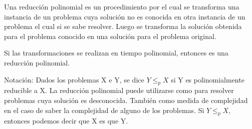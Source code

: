 \documentclass[../tp3_grupo404.tex]{subfiles}
\begin{document}
Una reducción polinomial es un procedimiento por el cual se transforma una instancia de un problema
cuya solución no es conocida en otra instancia de un problema el cual si se sabe resolver.
Luego se transforma la solución obtenida para el problema conocido en una solución para el problema
original.

Si las transformaciones se realizan en tiempo polinomial, entonces es una reducción polinomial.

Notación: Dados los problemas X e Y, se dice $Y \leq_p X$ si Y es polinomialmente reducible a X.
La reducción polinomial puede utilizarse como  para resolver problemas
cuya solución es desconocida. También como medida de complejidad en el caso de saber la
complejidad de alguno de los problemas.
Si $Y \leq_p X$, entonces podemos decir que X es  que Y.


\end{document}
